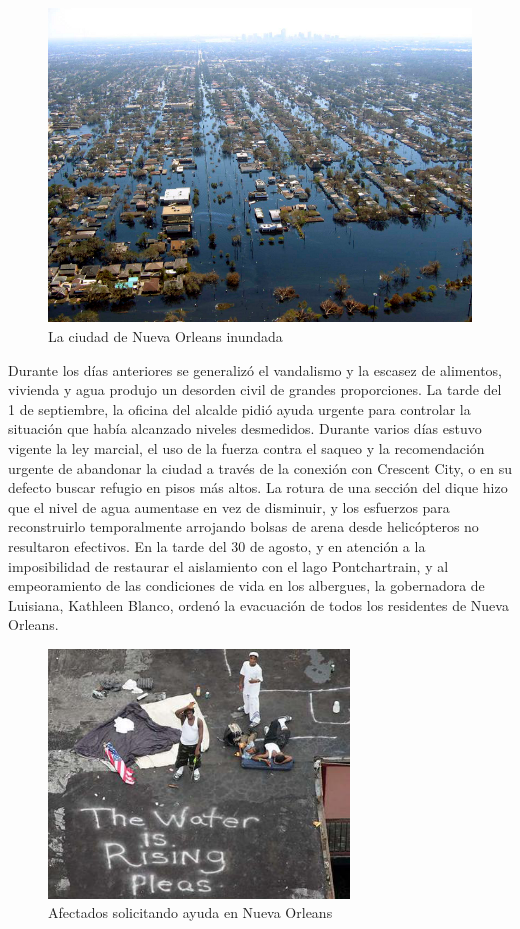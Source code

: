 \begin{figure}[H]
 \centering
 \includegraphics[width=130mm]{figuras/cap0/flood.png}
 \caption{La ciudad de Nueva Orleans inundada}
\end{figure}

Durante los días anteriores se generalizó el vandalismo y la escasez de
alimentos, vivienda y agua produjo un desorden civil de grandes proporciones. La
tarde del 1 de septiembre, la oficina del alcalde pidió ayuda urgente para
controlar la situación que había alcanzado niveles desmedidos. Durante varios
días estuvo vigente la ley marcial, el uso de la fuerza contra el saqueo y la
recomendación urgente de abandonar la ciudad a través de la conexión con
Crescent City, o en su defecto buscar refugio en pisos más altos. La rotura de
una sección del dique hizo que el nivel de agua aumentase en vez de disminuir, y
los esfuerzos para reconstruirlo temporalmente arrojando bolsas de arena desde
helicópteros no resultaron efectivos. En la tarde del 30 de agosto, y en
atención a la imposibilidad de restaurar el aislamiento con el lago
Pontchartrain, y al empeoramiento de las condiciones de vida en los albergues,
la gobernadora de Luisiana, Kathleen Blanco, ordenó la evacuación de todos los
residentes de Nueva Orleans\cite{DeLozier}.

\begin{figure}[H]
 \centering
 \includegraphics[width=80mm]{figuras/cap0/help.png}
 \caption{Afectados solicitando ayuda en Nueva Orleans}
\end{figure}

